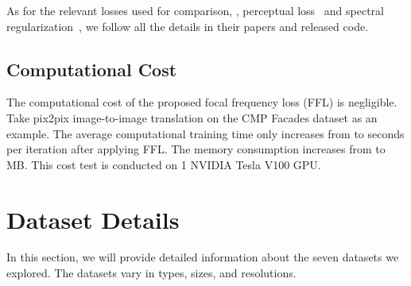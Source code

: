 \documentclass[10pt,twocolumn,letterpaper]{article}
\begin{document}
\vspace{0.05cm}
As for the relevant losses used for comparison, \ie, perceptual loss~\cite{perceptualloss} and spectral regularization~\cite{specreg}, we follow all the details in their papers and released code.


\subsection{Computational Cost}
\label{sec:computationalcost}
The computational cost of the proposed focal frequency loss (FFL) is negligible. 
Take pix2pix image-to-image translation on the CMP Facades dataset as an example. The average computational training time only increases from  to  seconds per iteration after applying FFL.
The memory consumption increases from  to  MB.
This cost test is conducted on 1 NVIDIA Tesla V100 GPU.



\section{Dataset Details}
\label{sec:dataset}
In this section, we will provide detailed information about the seven datasets we explored. The datasets vary in types, sizes, and resolutions.
\end{document}
